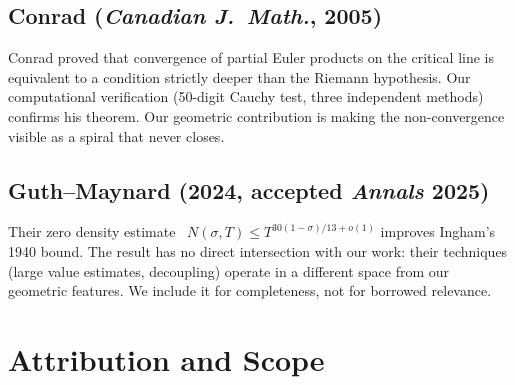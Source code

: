 \documentclass[11pt]{amsart}
\begin{document}
\subsection{Conrad (\textit{Canadian J.\ Math.}, 2005)}

Conrad proved that convergence of partial Euler products on the critical line
is equivalent to a condition strictly deeper than the Riemann hypothesis. Our
computational verification (50-digit Cauchy test, three independent methods)
confirms his theorem. Our geometric contribution is making the
non-convergence visible as a spiral that never closes.

\subsection{Guth--Maynard (2024, accepted \textit{Annals} 2025)}

Their zero density estimate~\cite{GuthMaynard2024}
$N(\sigma,T) \le T^{30(1-\sigma)/13 + o(1)}$ improves Ingham's 1940 bound.
The result has no direct intersection with our work: their techniques (large
value estimates, decoupling) operate in a different space from our geometric
features. We include it for completeness, not for borrowed relevance.


\section{Attribution and Scope}
\label{sec:attribution}
\end{document}
